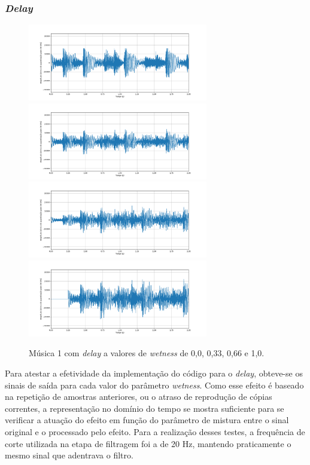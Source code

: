 \subsubsection*{\textit{Delay}}


\begin{figure}[h]
    \centering
    \includegraphics[width=0.7\textwidth]{figuras/fig89.png}
    \includegraphics[width=0.7\textwidth]{figuras/fig90.png}
    \includegraphics[width=0.7\textwidth]{figuras/fig91.png}
    \includegraphics[width=0.7\textwidth]{figuras/fig92.png}
    \caption{Música 1 com \textit{delay} a valores de \textit{wetness} de 0,0, 0,33, 0,66 e 1,0.}
    \label{fig89}
\end{figure}


Para atestar a efetividade da implementação do código para o \textit{delay}, obteve-se os sinais de saída para cada valor do parâmetro \textit{wetness}. Como esse efeito é baseado na repetição de amostras anteriores, ou o atraso de reprodução de cópias correntes, a representação no domínio do tempo se mostra suficiente para se verificar a atuação do efeito em função do parâmetro de mistura entre o sinal original e o processado pelo efeito. 
Para a realização desses testes, a frequência de corte utilizada na etapa de filtragem foi a de 20 Hz, mantendo praticamente o mesmo sinal que adentrava o filtro. %

